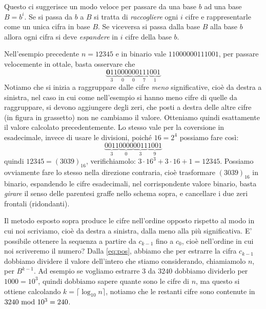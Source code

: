 Questo ci suggerisce un modo veloce per passare da una base $b$ ad una base $B=b^i$. Se si passa da $b$ a $B$ si tratta di \emph{raccogliere} ogni $i$ cifre e rappresentarle come un unica cifra in base $B$. Se viceversa si passa dalla base $B$ alla base $b$ allora ogni cifra si deve \emph{espandere} in $i$
cifre della base $b$.

\begin{ex}
Nell'esempio precedente $n=12345$ e in binario vale $11000000111001$, per passare velocemente in ottale, basta osservare che
\[
\underbrace{\mathbf{0}11}_{3}\underbrace{000}_{0}\underbrace{000}_{0}\underbrace{111}_{7}\underbrace{001}_{1}
\]
\noindent Notiamo che si inizia a raggruppare dalle cifre \emph{meno} significative, cioè da destra a sinistra, nel caso in cui come nell'esempio si hanno meno cifre di quelle da raggruppare, si devono aggiungere degli zeri, che posti a destra delle altre cifre (in figura in grassetto) non ne cambiamo il valore. Otteniamo
quindi esattamente il valore calcolato precedentemente. Lo stesso vale per la coversione in esadecimale, invece di usare le divisioni, poiché $16 = 2^4$ possiamo fare così:
\[
\underbrace{0011}_{3}\underbrace{0000}_{0}\underbrace{0011}_{3}\underbrace{1001}_{9}
\]
quindi $12345 = (3039)_{16}$, verifichiamolo: $3\cdot{16}^3+3\cdot{16}+1 = 12345$. Possiamo ovviamente fare lo stesso nella direzione contraria, cioè trasformare $(3039)_{16}$ in binario, espandendo le cifre esadecimali, nel corrispondente valore binario, basta \emph{girare} il senso delle parentesi graffe nello schema sopra, e cancellare i due zeri frontali (ridondanti).
\end{ex}

Il metodo esposto sopra produce le cifre nell'ordine opposto rispetto al modo in cui noi scriviamo,  
cioè da destra a sinistra, dalla meno alla più significativa. E' possibile ottenere la sequenza a partire da $c_{k-1}$ fino
a $c_0$, cioè nell'ordine in cui noi scriveremo il numero? Dalla \eqref{eq:pos},
abbiamo che per estrarre la cifra $c_{k-1}$ dobbiamo dividere il valore dell'intero che stiamo considerando, chiamiamolo $n$, per $B^{k-1}$. Ad esempio
se vogliamo estrarre $3$ da $3240$ dobbiamo dividerlo per $1000 = 10^3$, quindi dobbiamo sapere quante sono le cifre di $n$, ma questo si ottiene calcolando
$k = \lceil \log_{10} n \rceil$, notiamo che le restanti cifre sono contenute in $3240 \ \text{mod}\ 10^3 = 240$.

